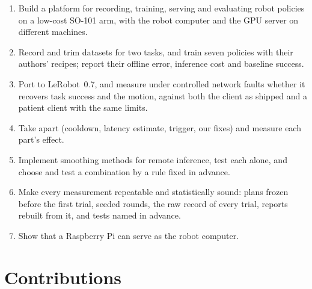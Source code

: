 \begin{enumerate}[label=O\arabic*.]
\item Build a platform for recording, training, serving and evaluating robot policies on a low-cost SO-101 arm, with
      the robot computer and the GPU server on different machines.
\item Record and trim datasets for two tasks, and train seven policies with their authors' recipes; report their
      offline error, inference cost and baseline success.
\item Port \drtc{} to LeRobot~0.7, and measure under controlled network faults whether it recovers task success and the
      motion, against both the client as shipped and a patient client with the same limits.
\item Take \drtc{} apart (cooldown, latency estimate, trigger, our fixes) and measure each part's effect.
\item Implement smoothing methods for remote inference, test each alone, and choose and test a combination by a rule
      fixed in advance.
\item Make every measurement repeatable and statistically sound: plans frozen before the first trial, seeded rounds,
      the raw record of every trial, reports rebuilt from it, and tests named in advance.
\item Show that a Raspberry Pi can serve as the robot computer.
\end{enumerate}

\section{Contributions}

